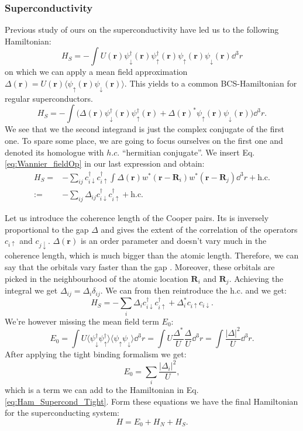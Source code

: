 \documentclass[../main.tex]{subfile}
\begin{document}
\subsubsection{Superconductivity}
Previous study of ours on the superconductivity have led us to the following Hamiltonian:
\begin{equation}\label{eq:Ham_Supercond_Tight}
    H_S = - \int U(\bm{r}) \psi_{\downarrow}^{\dagger}(\bm{r})\psi_{\uparrow}^{\dagger}(\bm{r})\psi_{\uparrow}(\bm{r})\psi_{\downarrow}(\bm{r}) \dd^3r
\end{equation}
on which we can apply a mean field approximation $\Delta(\bm{r}) = U(\bm{r})\langle \psi_{\uparrow}(\bm{r})\psi_{\downarrow}(\bm{r})\rangle$.
This yields to a common BCS-Hamiltonian for regular superconductors.\\
\[
    H_S = - \int \biggl(\Delta(\bm{r}) \psi_{\downarrow}^{\dagger}(\bm{r})\psi_{\uparrow}^{\dagger}(\bm{r}) +
     \Delta(\bm{r})^{\ast}\psi_{\uparrow}(\bm{r})\psi_{\downarrow}(\bm{r})\biggr) \dd^3r.
\]  
We see that we the second integrand is just the complex conjugate of the first one. 
To spare some place, we are going to focus ourselves on the first one and denoted its homologue with $h.c.$ ``hermitian conjugate''. We insert Eq. \ref{eq:Wannier_fieldOp} 
in our last expression and obtain:
\begin{align*}
    H_S =& - \sum_{ij} c_{i\downarrow}^{\dagger}c_{i\uparrow}^{\dagger} \int \Delta(\bm{r}) w^{\ast}(\bm{r} - \bm{R}_i) w^{\ast}(\bm{r} - \bm{R}_j) \dd^3r + \text{h.c.}\\
    :=& -\sum_{ij} \Delta_{ij} c_{i\downarrow}^{\dagger}c_{i\uparrow}^{\dagger} + \text{h.c.}
\end{align*}

Let us introduce the coherence length of the Cooper pairs. Its is inversely proportional to the gap $\Delta$ and gives the extent of the correlation of the operators $c_{i\uparrow}$ and $c_{j\downarrow}$.
$\Delta(\bm{r})$ is an order parameter and doesn't vary much in the coherence length, which is much bigger than the atomic length.
Therefore, we can say that the orbitals vary faster than the gap \cite{Jabir2021}. Moreover, these orbitals are picked in the neighbourhood of the atomic location $\bm{R}_i$ and $\bm{R}_j$.
Achieving the integral we get $\Delta_{ij} = \Delta_i \delta_{ij}$. We can from then reintroduce the h.c. and we get:
\begin{equation}\label{eq:Ham_Superc    ond_Tight}
    H_S = -\sum_{i} \Delta_i c_{i\downarrow}^{\dagger}c_{i\uparrow}^{\dagger} + \Delta_i^{\ast} c_{i\uparrow}c_{i\downarrow}.
\end{equation}
We're however missing the mean field term $E_0$:
\[
    E_0 = \int U \langle \psi_{\downarrow}^{\dagger}\psi_{\uparrow}^{\dagger}\rangle \langle\psi_{\uparrow}\psi_{\downarrow}\rangle \dd^3r 
    = \int U \frac{\Delta^{\ast}}{U}\frac{\Delta}{U} \dd^3r = \int \frac{|\Delta|^2}{U} \dd^3r.
\]
After applying the tight binding formalism we get:
\[
    E_0 = \sum_{i} \frac{|\Delta_i|^2}{U},
\]
which is a term we can add to the Hamiltonian in Eq. \ref{eq:Ham_Supercond_Tight}. Form these equations we have the final 
Hamiltonian for the superconducting system:
\[
    H = E_0 + H_N + H_S.
\]  
\end{document}
